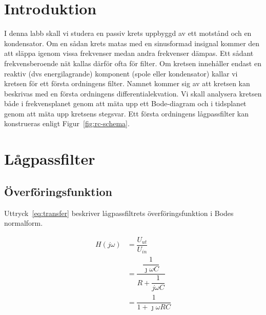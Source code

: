 %
%

\section{Introduktion}\label{intro}
I denna labb skall vi studera en passiv krets uppbyggd av ett motstånd och en
kondensator. Om en sådan krets matas med en sinusformad insignal kommer den att
släppa igenom vissa frekvenser medan andra frekvenser dämpas. Ett sådant
frekvensberoende nät kallas därför ofta för filter. Om kretsen innehåller
endast en reaktiv (dvs energilagrande) komponent (spole eller kondensator)
kallar vi kretsen för ett första ordningens filter. Namnet kommer sig av att
kretsen kan beskrivas med en första ordningens differentialekvation.  Vi skall
analysera kretsen både i frekvensplanet genom att mäta upp ett Bode-diagram och
i tidsplanet genom att mäta upp kretsens stegsvar.  Ett första ordningens
lågpassfilter kan konstrueras enligt Figur~\ref{fig:rc-schema}.

\section{Lågpassfilter}
\subsection{Överföringsfunktion}
Uttryck~\eqref{eq:transfer} beskriver lågpassfiltrets överföringsfunktion i
Bodes normalform.

\begin{equation*}
  \begin{split}
    H(j\omega) &= \dfrac{U_{ut}}{U_{in}}                                      \\
               &= \dfrac{\dfrac{1}{\jmath\omega C}}{R + \dfrac{1}{j\omega C}} \\
               &= \dfrac{1}{1+\jmath\omega R C}                               \\
  \end{split}
\end{equation*}

